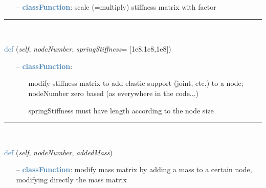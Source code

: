 \begin{itemize}[leftmargin=1.4cm]
\begin{itemize}[leftmargin=0.5cm]
\begin{itemize}[leftmargin=1.4cm]
\begin{itemize}[leftmargin=0.5cm]
\begin{flushleft}
\end{flushleft}
\setlength{\itemindent}{0.7cm}
\begin{itemize}[leftmargin=0.7cm]
  \item[--]  \textcolor{steelblue}{\bf classFunction}: scale (=multiply) stiffness matrix with factor\vspace{12pt}\end{itemize}
%
\noindent\rule{8cm}{0.75pt}\vspace{1pt} \\ 
\begin{flushleft}
\noindent \textcolor{steelblue}{def {\bf {}}}\label{sec:FEM:FEMinterface:AddElasticSupportAtNode}
({\it self}, {\it nodeNumber}, {\it springStiffness}= [1e8,1e8,1e8])
\end{flushleft}
\setlength{\itemindent}{0.7cm}
\begin{itemize}[leftmargin=0.7cm]
  \item[--]  \textcolor{steelblue}{\bf classFunction}: \vspace{-6pt}
  \begin{itemize}[leftmargin=1.2cm]
\setlength{\itemindent}{-0.7cm}
    \item[] modify stiffness matrix to add elastic support (joint, etc.) to a node; nodeNumber zero based (as everywhere in the code...)
    \item[] springStiffness must have length according to the node size
  \end{itemize}
\vspace{12pt}\end{itemize}
%
\noindent\rule{8cm}{0.75pt}\vspace{1pt} \\ 
\begin{flushleft}
\noindent \textcolor{steelblue}{def {\bf {}}}\label{sec:FEM:FEMinterface:AddNodeMass}
({\it self}, {\it nodeNumber}, {\it addedMass})
\end{flushleft}
\setlength{\itemindent}{0.7cm}
\begin{itemize}[leftmargin=0.7cm]
  \item[--]  \textcolor{steelblue}{\bf classFunction}: modify mass matrix by adding a mass to a certain node, modifying directly the mass matrix\vspace{12pt}\end{itemize}

\end{itemize}
\end{itemize}
\end{itemize}
\end{itemize}
